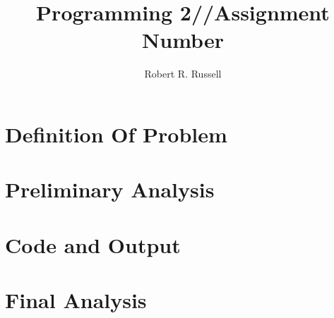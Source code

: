 \documentclass[letterpaper,10pt,oneside]{scrartcl}
\title{Programming 2//Assignment Number}
\author{Robert R. Russell}
\begin{document}
\maketitle

\begin{abstract}

\end{abstract}

\section{Definition Of Problem}

\section{Preliminary Analysis}

\section{Code and Output}

\section{Final Analysis}
\end{document}

